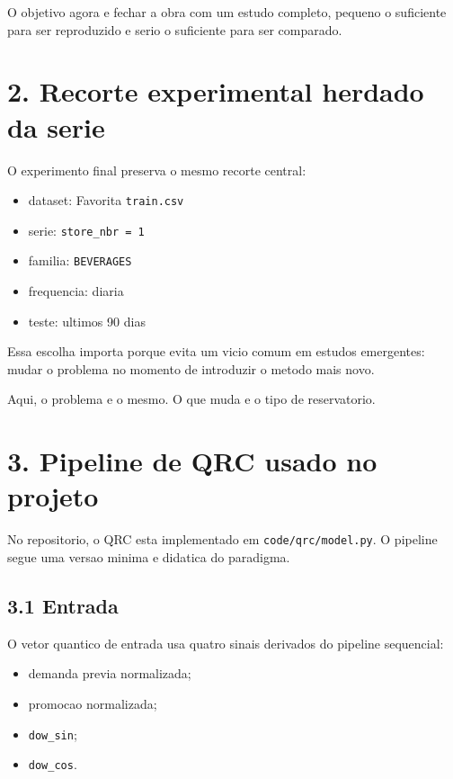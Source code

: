 \documentclass[12pt]{article}
\providecommand{\tightlist}{%
  \setlength{\itemsep}{0pt}\setlength{\parskip}{0pt}}
\begin{document}
O objetivo agora e fechar a obra com um estudo completo, pequeno o suficiente para ser reproduzido e serio o suficiente para ser comparado.

\section{2. Recorte experimental herdado da serie}\label{2-recorte-experimental-herdado-da-serie}

O experimento final preserva o mesmo recorte central:

\begin{itemize}
\tightlist
\item
  dataset: Favorita \texttt{train.csv}
\item
  serie: \texttt{store\_nbr\ =\ 1}
\item
  familia: \texttt{BEVERAGES}
\item
  frequencia: diaria
\item
  teste: ultimos 90 dias
\end{itemize}

Essa escolha importa porque evita um vicio comum em estudos emergentes: mudar o problema no momento de introduzir o metodo mais novo.

Aqui, o problema e o mesmo. O que muda e o tipo de reservatorio.

\section{3. Pipeline de QRC usado no projeto}\label{3-pipeline-de-qrc-usado-no-projeto}

No repositorio, o QRC esta implementado em \texttt{code/qrc/model.py}. O pipeline segue uma versao minima e didatica do paradigma.

\subsection{3.1 Entrada}\label{31-entrada}

O vetor quantico de entrada usa quatro sinais derivados do pipeline sequencial:

\begin{itemize}
\tightlist
\item
  demanda previa normalizada;
\item
  promocao normalizada;
\item
  \texttt{dow\_sin};
\item
  \texttt{dow\_cos}.
\end{itemize}
\end{document}
